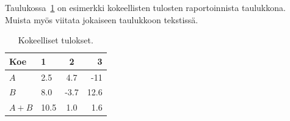 Taulukossa~\ref{table:results-fi} on esimerkki kokeellisten tulosten raportoinnista taulukkona. Muista myös viitata jokaiseen taulukkoon tekstissä.
\begin{table}[ht]
\centering
\caption{Kokeelliset tulokset.\label{table:results-fi}}
\begin{tabular}{l||l c r} 
Koe & 1 & 2 & 3 \\ 
\hline \hline 
$A$ & 2.5 & 4.7 & -11 \\
$B$ & 8.0 & -3.7 & 12.6 \\
$A+B$ & 10.5 & 1.0 & 1.6 \\
\hline
%
\end{tabular}
\end{table}

